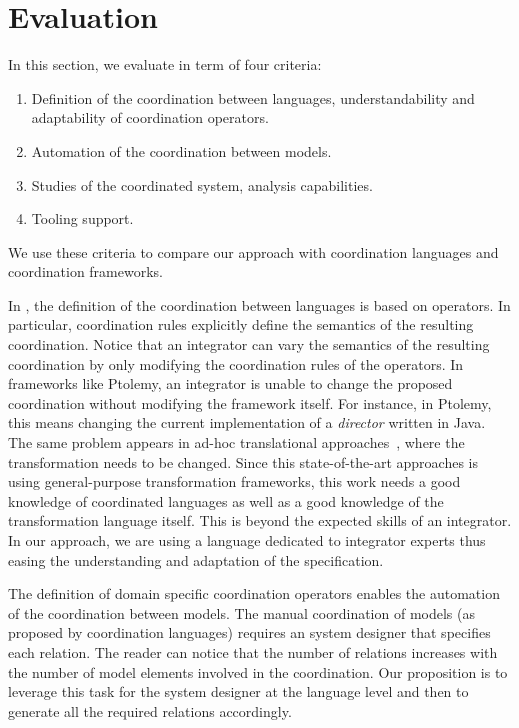 \section{Evaluation}
\label{sec:evaluation}
In this section, we evaluate \bcool in term of four criteria:
	\begin{enumerate}
		\item Definition of the coordination between languages, \ie understandability and adaptability of coordination operators. 
		\item Automation of the coordination between models. 
		\item Studies of the coordinated system, \ie analysis capabilities.
		\item Tooling support.
	\end{enumerate}  
We use these criteria to compare our approach with coordination languages and coordination frameworks.

In \bcool, the definition of the coordination between languages is based on operators. In particular, coordination rules explicitly define the semantics of the resulting coordination. Notice that an integrator can vary the semantics of the resulting coordination by only modifying the coordination rules of the operators. In frameworks like Ptolemy, an integrator is unable to change the proposed coordination without modifying the framework itself. For instance, in Ptolemy, this means changing the current implementation of a \emph{director} written in Java. The same problem appears in ad-hoc translational approaches~\cite{dinatale}, where the transformation needs to be changed. Since this state-of-the-art approaches is using general-purpose transformation frameworks, this work needs a good knowledge of coordinated languages as well as a good knowledge of the transformation language itself. This is beyond the expected skills of an integrator. In our approach, we are using a language dedicated to integrator experts thus easing the understanding and adaptation of the \bcool specification. 

The definition of domain specific coordination operators enables the automation of the coordination between models. The manual coordination of models (as proposed by coordination languages) requires an system designer that specifies each relation. The reader can notice that the number of relations increases with the number of model elements involved in the coordination. Our proposition is to leverage this task for the system designer at the language level and then to generate all the required relations accordingly.

